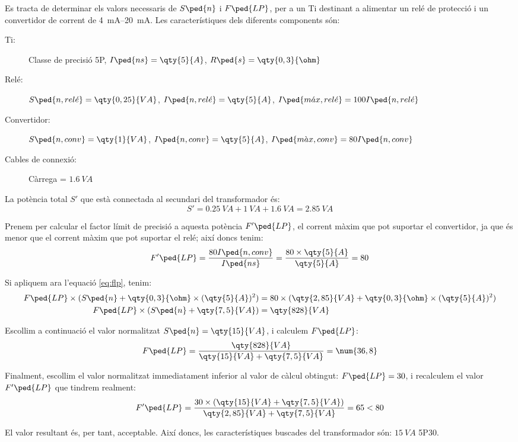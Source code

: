 	
\begin{exemple}[\CaractTrafoCorrent{}]
	\addcontentsxms{\CaractTrafoCorrent}
    Es tracta de determinar els valors necessaris de $S\ped{n}$ i $F\ped{LP}$,  per
    a un Ti destinant a alimentar  un relé de protecció i un convertidor
    de corrent de \qtyrange{4}{20}{mA}. Les característiques
    dels diferents components són:
    \begin{description}
        \item [\hspace{5mm}Ti:] Classe de precisió  5P, $I\ped{ns}=\qty{5}{A}$,
        $R\ped{s}=\qty{0,3}{\ohm}$
        \item [\hspace{5mm}Relé:] $S\ped{n,rel\acute{e}}=\qty{0,25}{VA}$,
        $I\ped{n,rel\acute{e}}=\qty{5}{A}$, $I\ped{m\acute{a}x,rel\acute{e}}=
        100 I\ped{n,rel\acute{e}}$
        \item [\hspace{5mm}Convertidor:] $S\ped{n,conv}=\qty{1}{VA}$,
        $I\ped{n,conv}=\qty{5}{A}$, $I\ped{m\grave{a}x,conv}=
        80 I\ped{n,conv}$
        \item [\hspace{5mm}Cables de connexió:] Càrrega = $\qty{1,6}{VA}$
    \end{description}

    La potència total $S'$ que està connectada al secundari del transformador
    és:
    \[
        S' = \qty{0,25}{VA} + \qty{1}{VA} + \qty{1,6}{VA} = \qty{2,85}{VA}
    \]

    Prenem per calcular el factor límit de precisió  a aquesta potència $F'\ped{LP}$, el
    corrent màxim que pot suportar el convertidor, ja que és menor que el corrent màxim que pot suportar el relé; així doncs tenim:
    \[
        F'\ped{LP} = \frac{80 I\ped{n,conv}}{I\ped{ns}} =
        \frac{80\times \qty{5}{A}}{\qty{5}{A}} = 80
    \]

    Si apliquem ara l'equació \eqref{eq:flp}, tenim:
    \begin{align*}
        F\ped{LP}\times(S\ped{n}+\qty{0,3}{\ohm} \times (\qty{5}{A})^2) &=
        80\times(\qty{2,85}{VA}+\qty{0,3}{\ohm} \times (\qty{5}{A})^2) \\
        F\ped{LP}\times(S\ped{n}+\qty{7,5}{VA}) &= \qty{828}{VA}
    \end{align*}

    Escollim a continuació el valor normalitzat $S\ped{n}=
    \qty{15}{VA}$, i calculem $F\ped{LP}$:
    \[
        F\ped{LP} = \frac{\qty{828}{VA}}{\qty{15}{VA}+\qty{7,5}{VA}}
        = \num{36,8}
    \]

    Finalment, escollim el valor normalitzat immediatament inferior al valor
    de càlcul obtingut: $F\ped{LP} = 30$, i
    recalculem el valor $F'\ped{LP}$ que tindrem realment:
    \[
    F'\ped{LP} = \frac{30\times(\qty{15}{VA} + \qty{7,5}{VA})}
    {\qty{2,85}{VA} + \qty{7,5}{VA}} = 65 < 80
    \]

    El valor resultant és, per tant, acceptable. Així doncs, les
    característiques buscades del transformador són: $\qty{15}{VA}$ 5P30.
\end{exemple}


